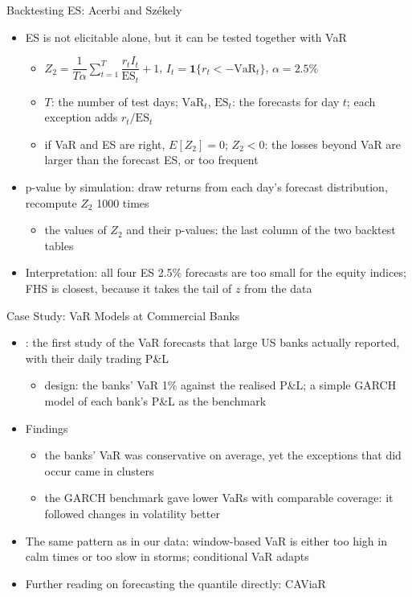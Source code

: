 \begin{frame}{Backtesting ES: Acerbi and Székely}
\itemsize{\footnotesize}
\begin{itemize}
    \item ES is not elicitable alone, but it can be tested together with VaR 
    \begin{itemize}
        \item $Z_2 = \dfrac{1}{T\alpha}\displaystyle\sum_{t=1}^{T}\dfrac{r_t I_t}{\mathrm{ES}_t} + 1$, \quad $I_t = \mathbf{1}\{r_t < -\mathrm{VaR}_t\}$, $\alpha = 2.5\%$
        \item $T$: the number of test days; $\mathrm{VaR}_t$, $\mathrm{ES}_t$: the forecasts for day $t$; each exception adds $r_t/\mathrm{ES}_t$
        \item if VaR and ES are right, $E[Z_2] = 0$; $Z_2 < 0$: the losses beyond VaR are larger than the forecast ES, or too frequent
    \end{itemize}
    \item p-value by simulation: draw returns from each day's forecast distribution, recompute $Z_2$ 1000 times
    \begin{itemize}
        \item the values of $Z_2$ and their p-values: the last column of the two backtest tables
    \end{itemize}
    \item Interpretation: all four ES 2.5\% forecasts are too small for the equity indices; FHS is closest, because it takes the tail of $z$ from the data
\end{itemize}
\end{frame}

\begin{frame}{Case Study: VaR Models at Commercial Banks}
\itemsize{\small}
\begin{itemize}
    \item {}: the first study of the VaR forecasts that large US banks actually reported, with their daily trading P\&L
    \begin{itemize}
        \item design: the banks' VaR 1\% against the realised P\&L; a simple GARCH model of each bank's P\&L as the benchmark
    \end{itemize}
    \item Findings
    \begin{itemize}
        \item the banks' VaR was conservative on average, yet the exceptions that did occur came in clusters
        \item the GARCH benchmark gave lower VaRs with comparable coverage: it followed changes in volatility better
    \end{itemize}
    \item The same pattern as in our data: window-based VaR is either too high in calm times or too slow in storms; conditional VaR adapts
    \item Further reading on forecasting the quantile directly: CAViaR 
\end{itemize}
\end{frame}


